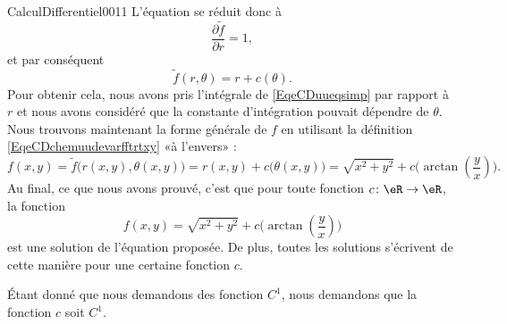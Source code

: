 \begin{corrige}{CalculDifferentiel0011}
	L'équation se réduit donc à
	\begin{equation}		\label{EqeCDuueqsimp}
		\frac{ \partial \tilde f }{ \partial r }=1,
	\end{equation}
	et par conséquent
	\begin{equation}
		\tilde f(r,\theta)=r+c(\theta).
	\end{equation}
	Pour obtenir cela, nous avons pris l'intégrale de \eqref{EqeCDuueqsimp} par rapport à $r$ et nous avons considéré que la constante d'intégration pouvait dépendre de $\theta$. Nous trouvons maintenant la forme générale de $f$ en utilisant la définition \eqref{EqeCDchemuudevarfftrtxy} «à l'envers» :
	\begin{equation}
		f(x,y)=\tilde f\big( r(x,y),\theta(x,y) \big)=r(x,y)+c\big( \theta(x,y) \big)=\sqrt{x^2+y^2}+c\big( \arctan\left( \frac{ y }{ x } \right) \big).
	\end{equation}
	Au final, ce que nous avons prouvé, c'est que pour toute fonction $c\colon \eR\to \eR$, la fonction
	\begin{equation}
		f(x,y)=\sqrt{x^2+y^2}+c\big( \arctan\left( \frac{ y }{ x } \right) \big)
	\end{equation}
	est une solution de l'équation proposée. De plus, toutes les solutions s'écrivent de cette manière pour une certaine fonction $c$.

	Étant donné que nous demandons des fonction $C^1$, nous demandons que la fonction $c$ soit $C^1$.

\end{corrige}
